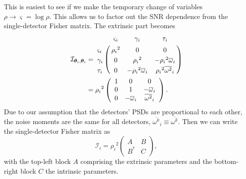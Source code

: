 \documentclass[amsmath,amssymb,aps,prx,reprint,nopreprintnumbers,nofootinbib,showpacs]{revtex4-1}
\newcommand\transpose{\ensuremath{^{^\mathsf{T}}}}
\begin{document}
This is easiest to see if we make the temporary change of variables $\rho \rightarrow \varsigma = \log \rho$. This allows us to factor out the \ac{SNR} dependence from the single-detector Fisher matrix. The extrinsic part becomes
%
\begin{align}
    \mathcal{I}_{\bm\theta_i,\bm\theta_i} &= \bordermatrix{
        ~ & \varsigma_i & \gamma_i & \tau_i \cr
        \varsigma_i & {\rho_i}^2 & 0 & 0 \cr
        \gamma_i & 0 & {\rho_i}^2 & -{\rho_i}^2 {\overline{\omega}}_i \cr
        \tau_i & 0 & -{\rho_i}^2 {\overline{\omega}}_i & {\rho_i}^2 {\overline{\omega^2}}_i
    }
    \\
    \nonumber
    &= {\rho_i}^2 \left( \begin{array}{ccc}
        1 & 0 & 0 \\
        0 & 1 & -{\overline{\omega}}_i \\
        0 & -{\overline{\omega}}_i & {\overline{\omega^2}}_i
    \end{array} \right).
\end{align}
%
Due to our assumption that the detectors' \acp{PSD} are proportional to each other, the noise moments are the same for all detectors, ${\overline{\omega^k}}_i \equiv {\overline{\omega^k}}$. Then we can write the single-detector Fisher matrix as
%
\begin{equation}
    \mathcal{I}_i = {\rho_i}^2 \left(
        \begin{array}{cc}
            A & B \\
            B\transpose & C
        \end{array}
    \right),
\end{equation}
%
with the top-left block $A$ comprising the extrinsic parameters and the bottom-right block $C$ the intrinsic parameters.
\end{document}
